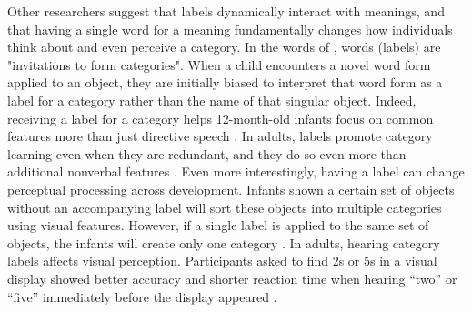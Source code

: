 \documentclass[../dissertation.tex]{subfiles}
\begin{document}
	Other researchers suggest that labels dynamically interact with meanings, and that having a single word for a meaning fundamentally changes how individuals think about and even perceive a category. In the words of \citet{Waxman1995}, words (labels) are "invitations to form categories". When a child encounters a novel word form applied to an object, they are initially biased to interpret that word form as a label for a category rather than the name of that singular object. Indeed, receiving a label for a category helps 12-month-old infants focus on common features more than just directive speech \citep{Althaus2014}. In adults, labels promote category learning even when they are redundant, and they do so even more than additional nonverbal features \citep{Lupyan2007}. Even more interestingly, having a label can change perceptual processing across development. Infants shown a certain set of objects without an accompanying label will sort these objects into multiple categories using visual features. However, if a single label is applied to the same set of objects, the infants will create only one category \citep{Plunkett2008}. In adults, hearing category labels affects visual perception. Participants asked to find 2s or 5s in a visual display showed better accuracy and shorter reaction time when hearing “two” or “five” immediately before the display appeared \citep{Lupyan2010}. \par
\end{document}
